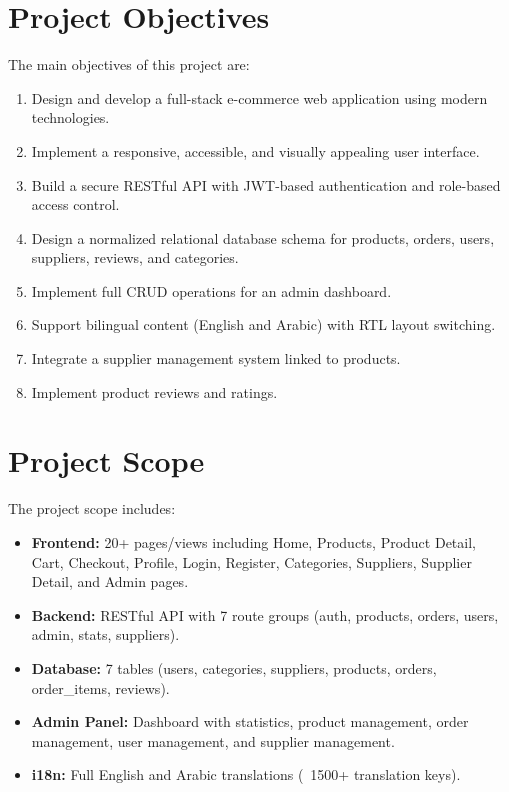 \documentclass[12pt,a4paper]{report}
\begin{document}
\section{Project Objectives}
The main objectives of this project are:
\begin{enumerate}[noitemsep]
  \item Design and develop a full-stack e-commerce web application using modern technologies.
  \item Implement a responsive, accessible, and visually appealing user interface.
  \item Build a secure RESTful API with JWT-based authentication and role-based access control.
  \item Design a normalized relational database schema for products, orders, users, suppliers, reviews, and categories.
  \item Implement full CRUD operations for an admin dashboard.
  \item Support bilingual content (English and Arabic) with RTL layout switching.
  \item Integrate a supplier management system linked to products.
  \item Implement product reviews and ratings.
\end{enumerate}

\section{Project Scope}
The project scope includes:
\begin{itemize}[noitemsep]
  \item \textbf{Frontend:} 20+ pages/views including Home, Products, Product Detail, Cart, Checkout, Profile, Login, Register, Categories, Suppliers, Supplier Detail, and Admin pages.
  \item \textbf{Backend:} RESTful API with 7 route groups (auth, products, orders, users, admin, stats, suppliers).
  \item \textbf{Database:} 7 tables (users, categories, suppliers, products, orders, order\_items, reviews).
  \item \textbf{Admin Panel:} Dashboard with statistics, product management, order management, user management, and supplier management.
  \item \textbf{i18n:} Full English and Arabic translations (~1500+ translation keys).
\end{itemize}
\end{document}

